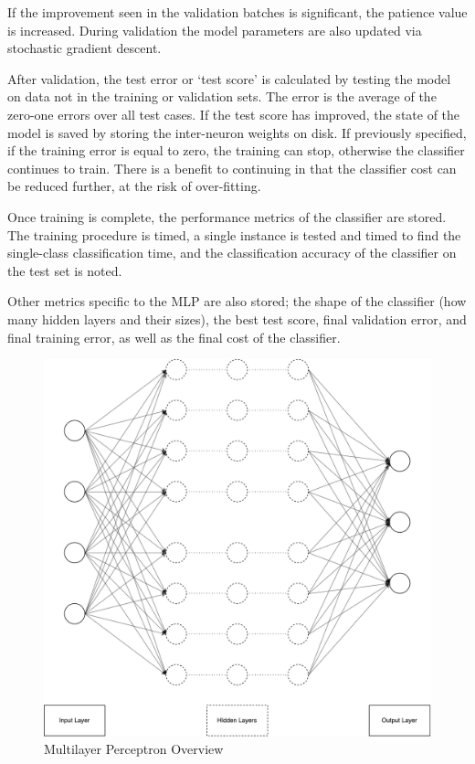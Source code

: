 If the improvement seen in the validation batches is significant, the patience value is increased. During validation the model parameters are also updated via stochastic gradient descent.

After validation, the test error or `test score' is calculated by testing the model on data not in the training or validation sets. The error is the average of the zero-one errors over all test cases. If the test score has improved, the state of the model is saved by storing the inter-neuron weights on disk. If previously specified, if the training error is equal to zero, the training can stop, otherwise the classifier continues to train. There is a benefit to continuing in that the classifier cost can be reduced further, at the risk of over-fitting.

Once training is complete, the performance metrics of the classifier are stored. The training procedure is timed, a single instance is tested and timed to find the single-class classification time, and the classification accuracy of the classifier on the test set is noted.

Other metrics specific to the MLP are also stored; the shape of the classifier (how many hidden layers and their sizes), the best test score, final validation error, and final training error, as well as the final cost of the classifier.

\begin{figure}[!h]
	
	\centering
	\includegraphics[width=\textwidth]{figures/multilayer_perceptron}
	\centering
	\caption{Multilayer Perceptron Overview}
	\label{fig:multi}
\end{figure}


